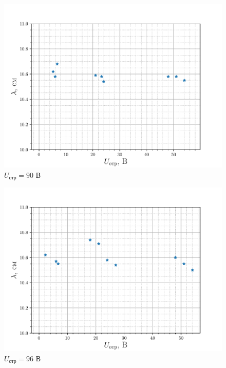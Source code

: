 \begin{figure}[H]
		\centering
		\includegraphics[height=0.4\textheight]{fig/res90V_2}
		\caption{$U_{\text{отр}}=90$ В}
		\label{fig:res90V_2}
\end{figure}
\begin{figure}[H]
		\centering
		\includegraphics[height=0.4\textheight]{fig/res96V_2}
		\caption{$U_{\text{отр}}=96$ В}
		\label{fig:res96V_2}
\end{figure}
